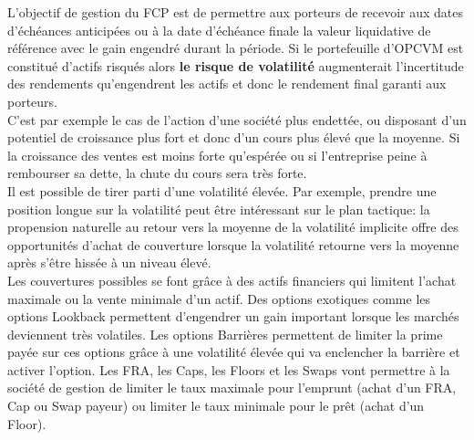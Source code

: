 \documentclass[french,12pt,a4paper]{article}
\begin{document}
\indent L'objectif de gestion du FCP est de permettre aux porteurs de recevoir aux dates d'échéances anticipées ou à la date d'échéance finale la valeur liquidative de référence avec le gain engendré durant la période. Si le portefeuille d'OPCVM est constitué d'actifs risqués alors \textbf{le risque de volatilité} augmenterait l'incertitude des rendements qu'engendrent les actifs et donc le rendement final garanti aux porteurs. \\
\indent C'est par exemple le cas de l'action d'une société plus endettée, ou disposant d'un potentiel de croissance plus fort et donc d'un cours plus élevé que la moyenne. Si la croissance des ventes est moins forte qu'espérée ou si l'entreprise peine à rembourser sa dette, la chute du cours sera très forte. \\
\indent Il est possible de tirer parti d'une volatilité élevée. Par exemple, prendre une position longue sur la volatilité peut être intéressant sur le plan tactique: la propension naturelle au retour vers la moyenne de la volatilité implicite offre des opportunités d'achat de couverture lorsque la volatilité retourne vers la moyenne après s'être hissée à un niveau élevé. \\
Les couvertures possibles se font grâce à des actifs financiers qui limitent l'achat maximale ou la vente minimale d'un actif. Des options exotiques comme les options Lookback permettent d'engendrer un gain important lorsque les marchés deviennent très volatiles. Les options Barrières permettent de limiter la prime payée sur ces options grâce à une volatilité élevée qui va enclencher la barrière et activer l'option. Les FRA, les Caps, les Floors et les Swaps vont permettre à la société de gestion de limiter le taux maximale pour l'emprunt (achat d'un FRA, Cap ou Swap payeur) ou limiter le taux minimale pour le prêt (achat d'un Floor). \\
\end{document}
